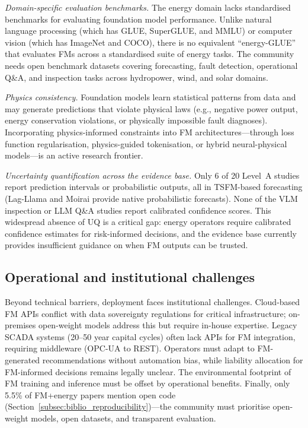 \documentclass[preprint,12pt]{elsarticle}
\begin{document}
\textit{Domain-specific evaluation benchmarks.} The energy domain lacks standardised benchmarks for evaluating foundation model performance. Unlike natural language processing (which has GLUE, SuperGLUE, and MMLU) or computer vision (which has ImageNet and COCO), there is no equivalent ``energy-GLUE'' that evaluates FMs across a standardised suite of energy tasks. The community needs open benchmark datasets covering forecasting, fault detection, operational Q\&A, and inspection tasks across hydropower, wind, and solar domains.

\textit{Physics consistency.} Foundation models learn statistical patterns from data and may generate predictions that violate physical laws (e.g., negative power output, energy conservation violations, or physically impossible fault diagnoses). Incorporating physics-informed constraints into FM architectures---through loss function regularisation, physics-guided tokenisation, or hybrid neural-physical models---is an active research frontier.

\textit{Uncertainty quantification across the evidence base.} Only 6 of 20 Level~A studies report prediction intervals or probabilistic outputs, all in TSFM-based forecasting (Lag-Llama \cite{rasul2023lagllama} and Moirai \cite{woo2024moirai} provide native probabilistic forecasts). None of the VLM inspection or LLM Q\&A studies report calibrated confidence scores. This widespread absence of UQ is a critical gap: energy operators require calibrated confidence estimates for risk-informed decisions, and the evidence base currently provides insufficient guidance on when FM outputs can be trusted.

\subsection{Operational and institutional challenges}
\label{subsec:operational_challenges}

Beyond technical barriers, deployment faces institutional challenges. Cloud-based FM APIs conflict with data sovereignty regulations for critical infrastructure; on-premises open-weight models address this but require in-house expertise. Legacy SCADA systems (20--50 year capital cycles) often lack APIs for FM integration, requiring middleware (OPC-UA to REST). Operators must adapt to FM-generated recommendations without automation bias, while liability allocation for FM-informed decisions remains legally unclear. The environmental footprint of FM training and inference must be offset by operational benefits. Finally, only 5.5\% of FM+energy papers mention open code (Section~\ref{subsec:biblio_reproducibility})---the community must prioritise open-weight models, open datasets, and transparent evaluation.
\end{document}
